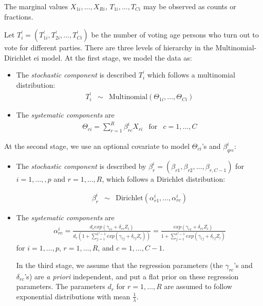 \noindent 
The marginal values $X_{1i},\dots,X_{Ri}$, $T_{1i},\dots,T_{Ci}$ may be
observed as counts or fractions.

Let $T_i^{'}=(T_{1i}^{'},T_{2i}^{'},\dots,T_{Ci}^{'})$ be the number
of voting age persons who turn out to vote for different parties.
There are three levels of hierarchy in the 
Multinomial-Dirichlet {\sc ei} model.  At the first stage, we model
the data as:
\begin{itemize}

\item The \emph{stochastic component} is described $T_i^{'}$ which
follows a multinomial distribution: 
\begin{eqnarray*}
T_i^{'} &\sim & \textrm{Multinomial}(\Theta_{1i},\dots,\Theta_{Ci})
\end{eqnarray*}

\item The \emph{systematic components} are
\begin{eqnarray*}
\Theta_{ci}=\sum_{r=1}^{R}\beta_{rc}^{i}X_{ri} & \textrm{for} &  c=1,\dots,C
\end{eqnarray*}

\end{itemize}

At the second stage, we use an optional covariate to model
$\Theta_{ci}$'s and $\beta_{qrc}^{i}$: 
\begin{itemize}
\item The \emph{stochastic component} is described by
$\beta_{r}^{i}=(\beta_{r1},\beta_{r2},\dots,\beta_{r,C-1})$ for 
  $i=1,\dots,,p$ and $r=1,\dots,R$,  which follows a Dirichlet distribution:

  \begin{eqnarray*}
    \beta_r^{i}  &\sim & \textrm{Dirichlet}(\alpha_{r1}^{i},\dots,\alpha_{rc}^{i})
  \end{eqnarray*}

\item The \emph{systematic components} are 
\begin{eqnarray*}
  \alpha_{rc}^{i}=\frac{d_{r}exp(\gamma_{rc}+\delta_{rc}Z_{i})}{d_r(1+\sum_{j=1}^{C-1}exp(\gamma_{rj}+\delta_{rj}Z_i))} = \frac{exp(\gamma_{rc}+\delta_{rc}Z_i)}{1+\sum_{j=1}^{C-1}exp(\gamma_{rj}+\delta_{rj}Z_i)} 
\end{eqnarray*}
for $i=1, \dots,p$, $r=1,\dots,R$, and $c=1, \dots, C-1$.

In the third stage, we assume that the regression parameters (the
$\gamma_{rc}$'s and $\delta_{rc}$'s) are \emph{a priori} independent,
and put a flat prior on these regression parameters.  The parameters
$d_{r}$ for $r=1,\dots,R$ are assumed to follow exponential distributions with
mean $\frac{1}{\lambda}$.
\end{itemize}

